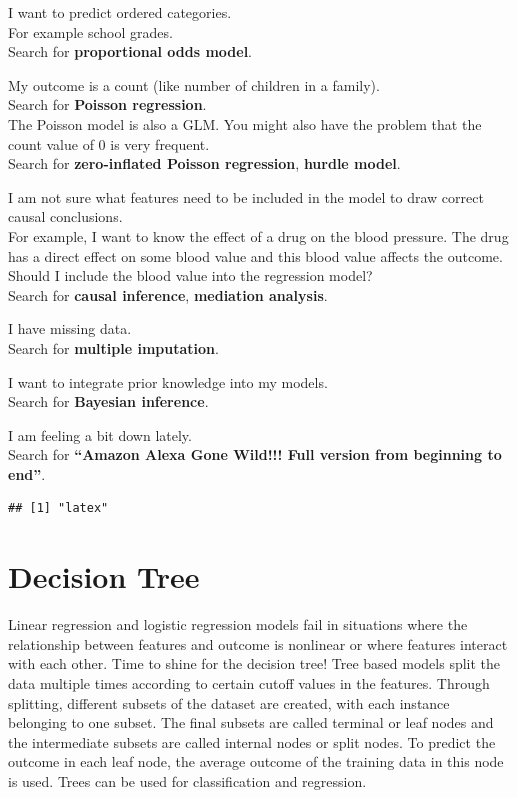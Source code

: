 \documentclass[
  11pt,
]{scrbook}
\begin{document}
I want to predict ordered categories.\\
For example school grades.\\
Search for \textbf{proportional odds model}.

My outcome is a count (like number of children in a family).\\
Search for \textbf{Poisson regression}.\\
The Poisson model is also a GLM.
You might also have the problem that the count value of 0 is very frequent.\\
Search for \textbf{zero-inflated Poisson regression}, \textbf{hurdle model}.

I am not sure what features need to be included in the model to draw correct causal conclusions.\\
For example, I want to know the effect of a drug on the blood pressure.
The drug has a direct effect on some blood value and this blood value affects the outcome.
Should I include the blood value into the regression model?\\
Search for \textbf{causal inference}, \textbf{mediation analysis}.

I have missing data.\\
Search for \textbf{multiple imputation}.

I want to integrate prior knowledge into my models.\\
Search for \textbf{Bayesian inference}.

I am feeling a bit down lately.\\
Search for \textbf{``Amazon Alexa Gone Wild!!! Full version from beginning to end''}.

\begin{verbatim}
## [1] "latex"
\end{verbatim}

\newpage

\hypertarget{tree}{%
\section{Decision Tree}\label{tree}}

Linear regression and logistic regression models fail in situations where the relationship between features and outcome is nonlinear or where features interact with each other.
Time to shine for the decision tree!
Tree based models split the data multiple times according to certain cutoff values in the features.
Through splitting, different subsets of the dataset are created, with each instance belonging to one subset.
The final subsets are called terminal or leaf nodes and the intermediate subsets are called internal nodes or split nodes.
To predict the outcome in each leaf node, the average outcome of the training data in this node is used.
Trees can be used for classification and regression.
\end{document}
